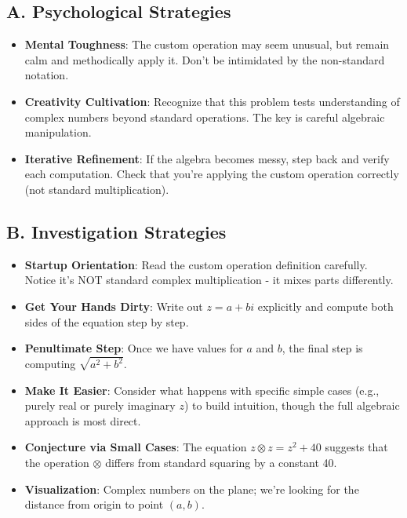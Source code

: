 \documentclass[12pt]{article}
\begin{document}
\begin{strategicbox}
\subsection*{A. Psychological Strategies}
\begin{itemize}[leftmargin=*]
    \item \textbf{Mental Toughness}: The custom operation may seem unusual, but remain calm and methodically apply it. Don't be intimidated by the non-standard notation.
    \item \textbf{Creativity Cultivation}: Recognize that this problem tests understanding of complex numbers beyond standard operations. The key is careful algebraic manipulation.
    \item \textbf{Iterative Refinement}: If the algebra becomes messy, step back and verify each computation. Check that you're applying the custom operation correctly (not standard multiplication).
\end{itemize}

\subsection*{B. Investigation Strategies}
\begin{itemize}[leftmargin=*]
    \item \textbf{Startup Orientation}: Read the custom operation definition carefully. Notice it's NOT standard complex multiplication - it mixes parts differently.
    \item \textbf{Get Your Hands Dirty}: Write out $z = a+bi$ explicitly and compute both sides of the equation step by step.
    \item \textbf{Penultimate Step}: Once we have values for $a$ and $b$, the final step is computing $\sqrt{a^2+b^2}$.
    \item \textbf{Make It Easier}: Consider what happens with specific simple cases (e.g., purely real or purely imaginary $z$) to build intuition, though the full algebraic approach is most direct.
    \item \textbf{Conjecture via Small Cases}: The equation $z \otimes z = z^2 + 40$ suggests that the operation $\otimes$ differs from standard squaring by a constant 40.
    \item \textbf{Visualization}: Complex numbers on the plane; we're looking for the distance from origin to point $(a,b)$.
\end{itemize}


\end{strategicbox}
\end{document}

